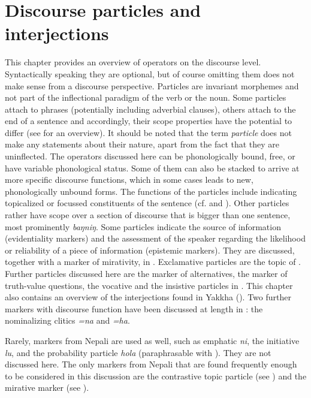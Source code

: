 ﻿\chapter{Discourse particles and interjections}\label{particles}

This chapter provides an overview of operators on the discourse level. Syntactically speaking they are optional, but of course omitting them does not make sense from a discourse perspective. Particles are invariant morphemes and not part of the inflectional paradigm of the verb or the noun. Some particles attach to phrases (potentially including adverbial clauses), others attach to the end of a sentence and accordingly, their scope properties have the potential to differ (see  for an overview). It should be noted that the term \emph{particle} does not make any statements about their nature, apart from the fact that they are uninflected. The operators discussed here can be phonologically bound,  free, or have  variable phonological status. Some of them can also  be stacked to arrive at more specific discourse functions, which in some cases leads to new, phonologically unbound forms. 
The functions of the particles include indicating topicalized or focussed constituents of the sentence (cf.  and ). Other particles rather have scope over a section of discourse that is bigger than one sentence, most prominently \emph{baŋniŋ}. Some particles indicate the source of information (evidentiality markers) and the assessment of the speaker regarding the likelihood or reliability of a piece of information (epistemic markers). They are discussed, together with a marker of mirativity, in . Exclamative particles are the topic of . Further particles discussed here are the marker of alternatives, the marker of truth-value questions, the vocative and the insistive particles in .  This chapter also contains an overview of the interjections found in Yakkha (). Two further markers with discourse function have been discussed at length in : the nominalizing clitics \emph{=na} and \emph{=ha}. 

Rarely, markers from Nepali are used as well, such as emphatic \emph{ni}, the initiative \emph{lu}, and the probability particle \emph{hola} (paraphrasable with ). They are not discussed here. The only markers from Nepali that are found frequently enough to be considered in this discussion are the contrastive topic particle (see ) and the mirative marker  (see ).

